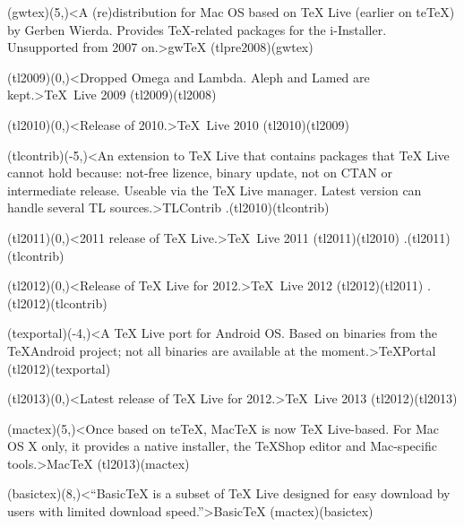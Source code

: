 {	\tonode[\histdistro](gwtex)(5,\layer)<A (re)distribution for Mac OS based on TeX Live (earlier on teTeX) by Gerben Wierda. Provides TeX-related packages for the i-Installer. Unsupported from 2007 on.>{gw\TeX}
	\todraw(tlpre2008)(gwtex)

	\steplayer

	\tonode(tl2009)(0,\layer)<Dropped Omega and Lambda. Aleph and Lamed are kept.>{\TeX\ Live 2009}
	\todraw(tl2009)(tl2008)
	\steplayer

	\tonode(tl2010)(0,\layer)<Release of 2010.>{\TeX\ Live 2010}
	\todraw(tl2010)(tl2009)


	\tonode(tlcontrib)(-5,\layer)<An extension to TeX Live that contains packages that TeX Live cannot hold because: not-free lizence, binary update, not on CTAN or intermediate release. Useable via the TeX Live manager. Latest version can handle several TL sources.>{TLContrib}
	\todraw.(tl2010)(tlcontrib)
	\steplayer

	\tonode(tl2011)(0,\layer)<2011 release of TeX Live.>{\TeX~Live 2011}
	\todraw(tl2011)(tl2010)
	\todraw.(tl2011)(tlcontrib)

	\steplayer

	\tonode(tl2012)(0,\layer)<Release of TeX Live for 2012.>{\TeX~Live 2012}
	\todraw(tl2012)(tl2011)
	\todraw.(tl2012)(tlcontrib)

	\tonode(texportal)(-4,\layer)<A TeX Live port for Android OS. Based on binaries from the TeXAndroid project; not all binaries are available at the moment.>{\TeX Portal}
	\todraw(tl2012)(texportal)

\steplayer

	\tonode(tl2013)(0,\layer)<Latest release of TeX Live for 2012.>{\TeX~Live 2013}
	\todraw(tl2012)(tl2013)

	\tonode(mactex)(5,\layer)<Once based on teTeX, MacTeX is now TeX Live-based. For Mac OS X only, it provides a native installer, the TeXShop editor and Mac-specific tools.>{Mac\TeX}
	\todraw(tl2013)(mactex)

	\tonode(basictex)(8,\layer)<“BasicTeX is a subset of TeX Live designed for easy download by users with limited download speed.”>{Basic\TeX}
	\todraw(mactex)(basictex)
}


